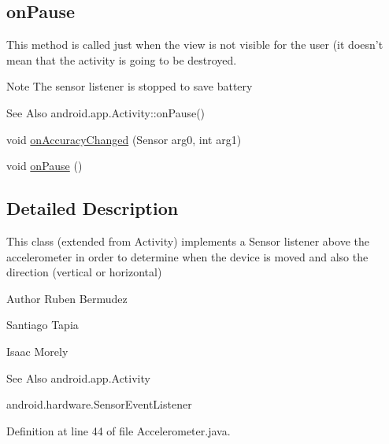 \subsection*{on\-Pause}
\label{_amgrpc29547226e19994144a930f16b44fad1}%
This method is called just when the view is not visible for the user (it doesn't mean that the activity is going to be destroyed.

\begin{DoxyNote}{Note}
The sensor listener is stopped to save battery
\end{DoxyNote}
\begin{DoxySeeAlso}{See Also}
android.\-app.\-Activity\-::on\-Pause() 
\end{DoxySeeAlso}
\begin{DoxyCompactItemize}
\item 
void \hyperlink{classnpi_1_1practicaandroid_1_1tutorialnpi_1_1_accelerometer_a848f58dd4fadf10976677336d40acd75}{on\-Accuracy\-Changed} (Sensor arg0, int arg1)
\item 
void \hyperlink{classnpi_1_1practicaandroid_1_1tutorialnpi_1_1_accelerometer_a0b620b3513837c76e6e2f5e11011464b}{on\-Pause} ()
\end{DoxyCompactItemize}


\subsection{Detailed Description}
This class (extended from Activity) implements a Sensor listener above the accelerometer in order to determine when the device is moved and also the direction (vertical or horizontal) 

\begin{DoxyAuthor}{Author}
Ruben Bermudez 

Santiago Tapia 

Isaac Morely
\end{DoxyAuthor}
\begin{DoxySeeAlso}{See Also}
android.\-app.\-Activity 

android.\-hardware.\-Sensor\-Event\-Listener 
\end{DoxySeeAlso}


Definition at line 44 of file Accelerometer.\-java.



